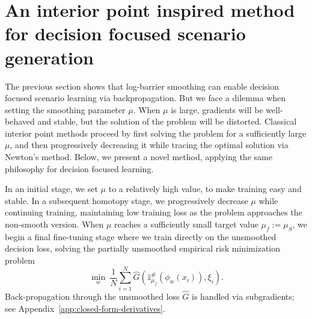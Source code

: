 \documentclass{article}
\newcommand{\1}{\mathbf{1}}
\theoremstyle{plain}
\theoremstyle{definition}
\theoremstyle{remark}
\begin{document}
\section{An interior point inspired method for decision focused scenario generation}
\label{sec:interior-point-method}
\label{sec:method}
\label{sec:nnipm}

The previous section shows that log-barrier smoothing can enable decision focused scenario learning via backpropagation.
But we face a dilemma when setting the smoothing parameter $\mu$.
When $\mu$ is large, gradients will be well-behaved and stable, but the solution of the problem will be distorted.
Classical interior point methods proceed by first solving the problem for a sufficiently large $\mu$, and then progressively decreasing it while tracing the optimal solution via Newton's method.
Below, we present a novel method, applying the same philosophy for decision focused learning.

In an initial stage, we set $\mu$ to a relatively high value, to make training easy and stable.
In a subsequent homotopy stage, we progressively decrease $\mu$ while continuing training, maintaining low training loss as the problem approaches the non-smooth version.
When $\mu$ reaches a sufficiently small target value $\mu_f:=\mu_S$, we begin a final fine-tuning stage where we train directly on the unsmoothed decision loss, solving the partially unsmoothed empirical risk minimization problem
\begin{equation}
\label{eq:nnipm-finetune}
\min_w\
\frac1N\sum_{i=1}^N
\hat G\!\left(\hat z_{\mu_f}^\#(\phi_w(x_i)),\xi_i\right).
\end{equation}
Back-propagation through the unsmoothed loss $\hat G$ is handled via subgradients; see Appendix~\ref{app:closed-form-derivatives}.
\end{document}
